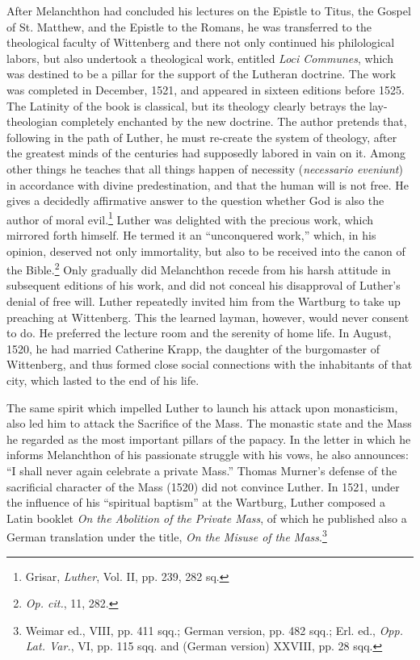 After Melanchthon had concluded his lectures on the Epistle to
Titus, the Gospel of St. Matthew, and the Epistle to the Romans, he
was transferred to the theological faculty of Wittenberg and there
not only continued his philological labors, but also undertook a theological
work, entitled \textit{Loci Communes}, which was destined to be a
pillar for the support of the Lutheran doctrine. The work was completed
in December, 1521, and appeared in sixteen editions before
1525. The Latinity of the book is classical, but its theology clearly
betrays the lay-theologian completely enchanted by the new doctrine.
The author pretends that, following in the path of Luther, he
must re-create the system of theology, after the greatest minds of
the centuries had supposedly labored in vain on it. Among other
things he teaches that all things happen of necessity (\textit{necessario eveniunt})
in accordance with divine predestination, and that the human
will is not free. He gives a decidedly affirmative answer to the question
whether God is also the author of moral evil.\footnote{Grisar, \textit{Luther}, Vol. II, pp. 239, 282 sq.}
Luther was delighted with
the precious work, which mirrored forth himself. He
termed it an “unconquered work,” which, in his opinion, deserved not
only immortality, but also to be received into the canon of the Bible.\footnote{\textit{Op. cit.}, 11, 282.}
Only gradually did Melanchthon recede from his harsh attitude in
subsequent editions of his work, and did not conceal his disapproval
of Luther’s denial of free will. Luther repeatedly invited him from
the Wartburg to take up preaching at Wittenberg. This the learned
layman, however, would never consent to do. He preferred the lecture
room and the serenity of home life. In August, 1520, he had married Catherine
Krapp, the daughter of the burgomaster of Wittenberg,
and thus formed close social connections with the inhabitants
of that city, which lasted to the end of his life.

The same spirit which impelled Luther to launch his attack upon
monasticism, also led him to attack the Sacrifice of the Mass. The
monastic state and the Mass he regarded as the most important pillars
of the papacy. In the letter in which he informs Melanchthon of his
passionate struggle with his vows, he also announces: “I shall never
again celebrate a private Mass.” Thomas Murner’s defense of the sacrificial
character of the Mass (1520) did not convince Luther. In 1521,
under the influence of his “spiritual baptism” at the Wartburg,
Luther composed a Latin booklet \textit{On the Abolition of the Private
Mass}, of which he published also a German translation under the title,
\textit{On the Misuse of the Mass}.\footnote
{Weimar ed., VIII, pp. 411 sqq.; German version, pp. 482 sqq.; Erl. ed., \textit{Opp. Lat. Var.},
VI, pp. 115 sqq. and (German version) XXVIII, pp. 28 sqq.}

